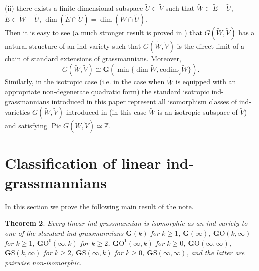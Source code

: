 \documentclass[12pt]{amsart}
\newcommand\codim{\text{codim}}
\newcommand{\Pic}{\operatorname{Pic}\nolimits}
\theoremstyle{definition}
\begin{document}
(ii) there exists a finite-dimensional subspace $\widetilde{U}\subset\widetilde{V}$ such that
$\widetilde{W}\subset\widetilde{E}+\widetilde{U}$, $\widetilde{E}\subset\widetilde{W}+\widetilde{U}$,
$\dim(\widetilde{E}\cap\widetilde{U})=\dim(\widetilde{W}\cap\widetilde{U})$.\\
Then it is easy to see (a much stronger result is proved in \cite{DiP}) that $G(\widetilde{W},\widetilde{V})$
has a natural structure of an ind-variety such that $G(\widetilde{W},\widetilde{V})$ is the direct limit of a chain of
standard extensions of grassmannians. Moreover,
$$
G(\widetilde{W},\widetilde{V})\cong\mathbf{G}(\min\{\dim\widetilde{W},\codim_{\widetilde{V}}\widetilde{W}\}).
$$
Similarly, in the isotropic case (i.e. in the case when $\widetilde{W}$ is equipped with an appropriate
non-degenerate quadratic form)
the standard isotropic ind-grassmannians introduced in this paper represent all isomorphism
classes of ind-varieties $G(\widetilde{W},\widetilde{V})$  introduced in \cite{DiP}
(in this case $\widetilde{W}$ is an isotropic subspace of $\widetilde{V}$) and satisfying
$\Pic G(\widetilde{W},\widetilde{V})\simeq\mathbb{Z}$.





\vspace{1cm}

\section{Classification of linear ind-grassmannians}\label{sec5}

\vspace{0.5cm}

In this section we prove the following main result of the note.

\textbf{Theorem 2}. \textit{Every linear ind-grassmannian is isomorphic as an ind-variety to one of the standard
ind-grassmannians $\mathbf{G}(k)$ for $k\ge1$, $\mathbf{G}(\infty)$, $\mathbf{G}\mathrm{O}(k,\infty)$ for $k\ge1$,
$\mathbf{G}\mathrm{O}^0(\infty,k)$ for $k\ge2$, $\mathbf{G}\mathrm{O}^1(\infty,k)$ for $k\ge0$,
$\mathbf{G}\mathrm{O}(\infty,\infty)$, $\mathbf{G}\mathrm{S}(k,\infty)$ for $k\ge2$, $\mathbf{G}\mathrm{S}(\infty,k)$
for $k\ge0$, $\mathbf{G}\mathrm{S}(\infty,\infty)$, and the latter are pairwise non-isomorphic}.
\end{document}
